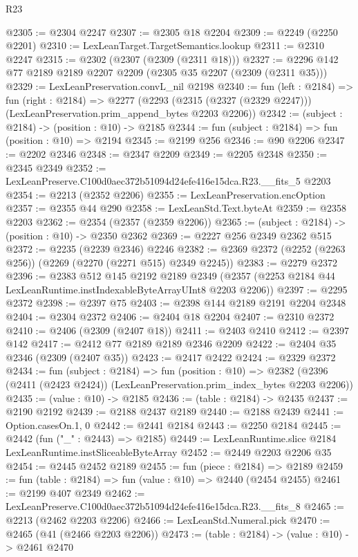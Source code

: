 \begin{lexlean}{R23}
\begin{coremodule}
@2305 := @2304 @2247
@2307 := @2305 @18 @2204
@2309 := @2249 (@2250 @2201)
@2310 := LexLeanTarget.TargetSemantics.lookup
@2311 := @2310 @2247
@2315 := @2302 (@2307 (@2309 (@2311 @18)))
@2327 := @2296 @142 @77 @2189 @2189 @2207 @2209 (@2305 @35 @2207 (@2309 (@2311 @35)))
@2329 := LexLeanPreservation.convL_nil @2198
@2340 := fun (left : @2184) =>
  fun (right : @2184) =>
  @2277 (@2293 (@2315 (@2327 (@2329 @2247))) (LexLeanPreservation.prim_append_bytes @2203 @2206))
@2342 := (subject : @2184) -> (position : @10) -> @2185
@2344 := fun (subject : @2184) => fun (position : @10) => @2194
@2345 := @2199 @256
@2346 := @90 @2206
@2347 := @2202 @2346
@2348 := @2347 @2209
@2349 := @2205 @2348
@2350 := @2345 @2349
@2352 := LexLeanPreserve.C100d0aec372b51094d24efe416e15dca.R23.__fits_5 @2203
@2354 := @2213 (@2352 @2206)
@2355 := LexLeanPreservation.encOption
@2357 := @2355 @44 @290
@2358 := LexLeanStd.Text.byteAt
@2359 := @2358 @2203
@2362 := @2354 (@2357 (@2359 @2206))
@2365 := (subject : @2184) -> (position : @10) -> @2350 @2362
@2369 := @2227 @256 @2349 @2362 @515
@2372 := @2235 (@2239 @2346) @2246
@2382 := @2369 @2372 (@2252 (@2263 @256)) (@2269 (@2270 (@2271 @515) @2349 @2245))
@2383 := @2279 @2372
@2396 := @2383
    @512
    @145
    @2192
    @2189
    @2349
    (@2357 (@2253 @2184 @44 LexLeanRuntime.instIndexableByteArrayUInt8 @2203 @2206))
@2397 := @2295 @2372
@2398 := @2397 @75
@2403 := @2398 @144 @2189 @2191 @2204 @2348
@2404 := @2304 @2372
@2406 := @2404 @18 @2204
@2407 := @2310 @2372
@2410 := @2406 (@2309 (@2407 @18))
@2411 := @2403 @2410
@2412 := @2397 @142
@2417 := @2412 @77 @2189 @2189 @2346 @2209
@2422 := @2404 @35 @2346 (@2309 (@2407 @35))
@2423 := @2417 @2422
@2424 := @2329 @2372
@2434 := fun (subject : @2184) =>
  fun (position : @10) =>
  @2382 (@2396 (@2411 (@2423 @2424)) (LexLeanPreservation.prim_index_bytes @2203 @2206))
@2435 := (value : @10) -> @2185
@2436 := (table : @2184) -> @2435
@2437 := @2190 @2192
@2439 := @2188 @2437 @2189
@2440 := @2188 @2439
@2441 := Option.casesOn.{1, 0}
@2442 := @2441 @2184
@2443 := @2250 @2184
@2445 := @2442 (fun ("_" : @2443) => @2185)
@2449 := LexLeanRuntime.slice @2184 LexLeanRuntime.instSliceableByteArray
@2452 := @2449 @2203 @2206 @35
@2454 := @2445 @2452 @2189
@2455 := fun (piece : @2184) => @2189
@2459 := fun (table : @2184) => fun (value : @10) => @2440 (@2454 @2455)
@2461 := @2199 @407 @2349
@2462 := LexLeanPreserve.C100d0aec372b51094d24efe416e15dca.R23.__fits_8
@2465 := @2213 (@2462 @2203 @2206)
@2466 := LexLeanStd.Numeral.pick
@2470 := @2465 (@41 (@2466 @2203 @2206))
@2473 := (table : @2184) -> (value : @10) -> @2461 @2470

\end{coremodule}
\end{lexlean}
